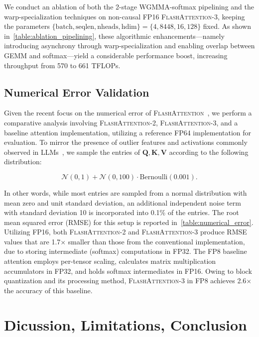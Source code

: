 \begin{enumerate}
\begin{itemize}
We conduct an ablation of both the 2-stage WGMMA-softmax pipelining and the warp-specialization techniques on non-causal FP16 \textsc{FlashAttention-3}, keeping the parameters $\{\text{batch}, \text{seqlen}, \text{nheads}, \text{hdim}\} = \{4, 8448, 16, 128\}$ fixed.
As shown in~\cref{table:ablation_pipelining}, these algorithmic enhancements—namely introducing asynchrony through warp-specialization and enabling overlap between GEMM and softmax—yield a considerable performance boost, increasing throughput from 570 to 661 TFLOPs.

\subsection{Numerical Error Validation}
\label{sec:numerical_error}

Given the recent focus on the numerical error of \textsc{FlashAttention}~\citep{golden2024flash}, we perform a comparative analysis involving \textsc{FlashAttention-2}, \textsc{FlashAttention-3}, and a baseline attention implementation, utilizing a reference FP64 implementation for evaluation. To mirror the presence of outlier features and activations commonly observed in LLMs~\citep{dettmers2208llm, sun2024massive}, we sample the entries of $\mathbf{Q}, \mathbf{K}, \mathbf{V}$ according to the following distribution:

\begin{equation*}
  \mathcal{N}(0, 1) + \mathcal{N}(0, 100) \cdot \mathrm{Bernoulli}(0.001).
\end{equation*}

In other words, while most entries are sampled from a normal distribution with mean zero and unit standard deviation, an additional independent noise term with standard deviation 10 is incorporated into 0.1\% of the entries. The root mean squared error (RMSE) for this setup is reported in~\cref{table:numerical_error}. Utilizing FP16, both \textsc{FlashAttention-2} and \textsc{FlashAttention-3} produce RMSE values that are 1.7$\times$ smaller than those from the conventional implementation, due to storing intermediate (softmax) computations in FP32. The FP8 baseline attention employs per-tensor scaling, calculates matrix multiplication accumulators in FP32, and holds softmax intermediates in FP16. Owing to block quantization and its processing method, \textsc{FlashAttention-3} in FP8 achieves 2.6$\times$ the accuracy of this baseline.

\section{Dicussion, Limitations, Conclusion}
\label{sec:discussion}


\end{itemize}
\end{enumerate}
